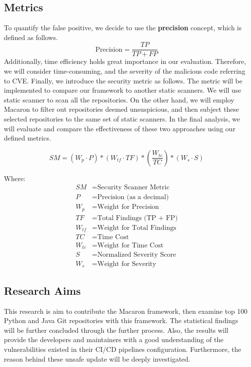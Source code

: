\subsection{Metrics}
To quantify the false positive, we decide to use the \textbf{precision} concept, which is defined as follows.
\[
    \text{Precision} = \frac{TP}{TP + FP}
\]
Additionally, time efficiency holds great importance in our evaluation. Therefore, we will consider time-consuming, and the severity of the malicious code 
referring to CVE. Finally, we introduce the security metric as follows. The metric will be implemented to compare our framework
to another static scanners. We will use static scanner to scan all the repositories. On the other hand, we will employ Macaron to filter out repositories 
deemed unsuspicious, and then subject these selected repositories to the same set of static scanners. 
In the final analysis, we will evaluate and compare the effectiveness of these two approaches using 
our defined metrics.

\begin{equation}
    SM = (W_p \cdot P) * (W_{tf} \cdot TF) * (\frac{W_{tc}}{TC}) * (W_s \cdot S)
    \end{equation}
    
Where:
\begin{align*}
SM & = \text{Security Scanner Metric} \\
P & = \text{Precision (as a decimal)} \\
W_p & = \text{Weight for Precision} \\
TF & = \text{Total Findings (TP + FP)} \\
W_{tf} & = \text{Weight for Total Findings} \\
TC & = \text{Time Cost} \\
W_{tc} & = \text{Weight for Time Cost} \\
S & = \text{Normalized Severity Score} \\
W_s & = \text{Weight for Severity}
\end{align*}

\subsection{Research Aims}
This research is aim to contribute the Macaron framework, then examine top 100 Python and Java Git 
repositories with this framework. The statistical findings will be further concluded through the further process.
Also, the results will provide the developers and maintainers with a good understanding 
of the vulnerabilities existed in their CI/CD pipelines configuration. Furthermore, the reason behind
these unsafe update will be deeply investigated.

